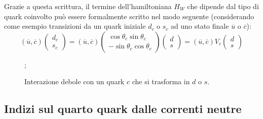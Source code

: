 \documentclass{subnucbo}
\begin{document}
Grazie a questa scrittura, il termine dell'hamiltoniana $H_{W}$ che dipende dal tipo di quark coinvolto può essere formalmente scritto nel modo seguente (considerando come esempio transizioni da un quark iniziale $d_{c}$ o $s_{c}$ ad uno stato finale $\overline{u}$ o $\overline{c}$):
\begin{equation}
        ( \overline { u } , \overline { c } ) \left( \begin{array} { c } { d _ { c } } \\ { s _ { c } } \end{array} \right) = ( \overline { u } , \overline { c } ) \left( \begin{array} { c } { \operatorname { c o s } \theta _ { c } \operatorname { s i n } \theta _ { c } } \\ { - \operatorname { s i n } \theta _ { c } \operatorname { c o s } \theta _ { c } } \end{array} \right) \left( \begin{array} { l } { d } \\ { s } \end{array} \right) = ( \overline { u } , \overline { c } ) V _ { c } \left( \begin{array} { l } { d } \\ { s } \end{array} \right)
\end{equation}

\begin{figure}[!h]
        \centering
        ;
        \caption{Interazione debole con un quark $c$ che si trasforma in $d$ o $s$.}
        \label{fig:gim_decay}
\end{figure}

\subsection{Indizi sul quarto quark dalle correnti neutre}
\end{document}
